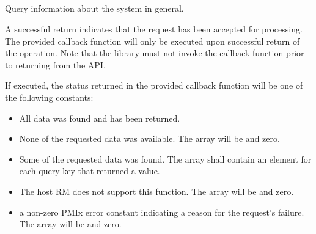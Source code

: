 \subsection{}

\summary

Query information about the system in general.

\format


\begin{arglist}
\end{arglist}

A successful return indicates that the request has been accepted for processing.
The provided callback function will only be executed upon successful return of the operation.
Note that the library must not invoke the callback function prior to returning from the \ac{API}.

\returnsimple

If executed, the status returned in the provided callback function will be one of the following constants:

\begin{itemize}
\item {} All data was found and has been returned.

\item {} None of the requested data was available.
The  array will be  and  zero.

\item {} Some of the requested data was found.
The  array shall contain an element for each query key that returned a value.

\item {} The host \ac{RM} does not support this function. The  array will be  and  zero.

\item a non-zero \ac{PMIx} error constant indicating a reason for the request's failure. The  array will be  and  zero.
\end{itemize}

